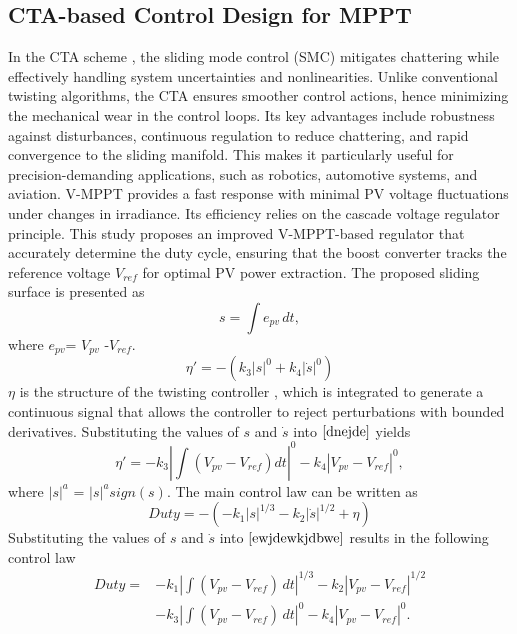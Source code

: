 \documentclass[preprint,12pt]{elsarticle}
\begin{document}
\subsection{CTA-based Control Design for MPPT}
\label{subsec:cta-mppt}
In the CTA scheme \cite{torres2017design}, the sliding mode control (SMC) mitigates chattering while effectively handling system uncertainties and nonlinearities. Unlike conventional twisting algorithms, the CTA ensures smoother control actions, hence minimizing the mechanical wear in the control loops. Its key advantages include robustness against disturbances, continuous regulation to reduce chattering, and rapid convergence to the sliding manifold. This makes it particularly useful for precision-demanding applications, such as robotics, automotive systems, and aviation. V-MPPT provides a fast response with minimal PV voltage fluctuations under changes in irradiance. Its efficiency relies on the cascade voltage regulator principle. This study proposes an improved V-MPPT-based regulator that accurately determine the duty cycle, ensuring that the boost converter tracks the reference voltage \(V_{ref}\) for optimal PV power extraction. The proposed sliding surface is presented as
\begin{equation}\label{jwdwekjd}
s = \int e_{pv} \, dt,
\end{equation}
where \(e_{pv}\)= \(V_{pv}\) -\(V_{ref}\). 
\begin{equation}\label{dnejde}
\eta' = - \left( k_3 |s|^0 + k_4 |\dot{s}|^0 \right)
\end{equation}
$\eta$ is the structure of the twisting controller \cite{torres2017design}, which is integrated to generate a continuous signal that allows the controller to reject perturbations with bounded derivatives. Substituting the values of \(s\) and \(\dot{s}\) into $\ref{dnejde}$ yields
\begin{equation}
\eta' = - k_3 \left| \int \left( V_{pv} - V_{ref} \right) dt \right|^0 - k_4 \left| V_{pv} - V_{ref} \right|^0 ,
\end{equation}
where \(|s|^a\) = \(|s|^a sign(s)\). The main control law can be written as
\begin{equation}\label{ewjdewkjdbwe}
Duty = -\left( -k_1 |s|^{1/3} - k_2 |\dot{s}|^{1/2} + \eta \right)
\end{equation}
Substituting the values of \(s\) and \(\dot{s}\) into $\ref{ewjdewkjdbwe}$ results in the following control law
\begin{equation}
\begin{aligned}
Duty ={}& -k_1 \left| \int (V_{pv} - V_{ref}) \, dt \right|^{1/3}
          - k_2 |V_{pv} - V_{ref}|^{1/2} \\
        &- k_3 \left| \int (V_{pv} - V_{ref}) \, dt \right|^0
          - k_4 |V_{pv} - V_{ref}|^0 .
\end{aligned}
\end{equation}
\end{document}
